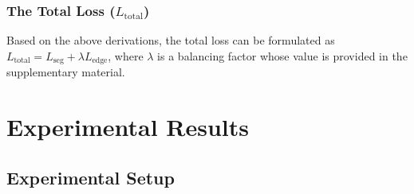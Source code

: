 \documentclass{bmvc2k}
\newcommand{\Lseg}{L_{\text{seg}}}
\newcommand{\Ledge}{L_{\text{edge}}}
\newcommand{\Ltotal}{L_{\text{total}}}
\begin{document}
\subsubsection{The Total Loss ($\Ltotal$)}

Based on the above derivations, the total loss can be formulated as $\Ltotal = \Lseg + \lambda \Ledge$,
where $\lambda$ is a balancing factor whose value is provided in the supplementary material.



































%
 






\section{Experimental Results}
\label{sec::experiments}











\subsection{Experimental Setup}
\label{subsec::experimental_setup}
\end{document}
